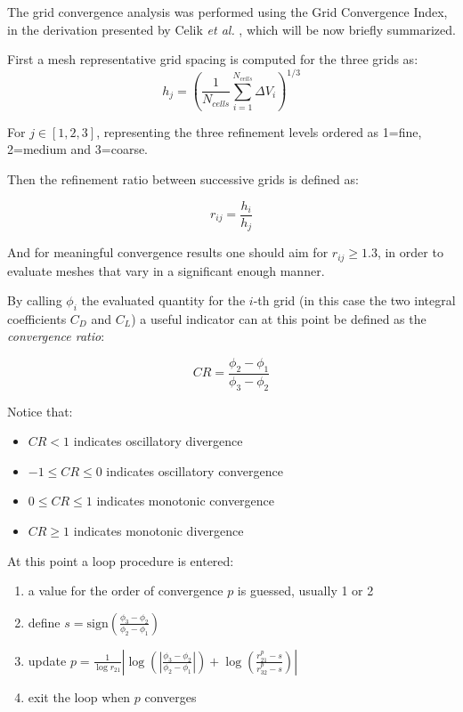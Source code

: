 \documentclass[12pt,a4paper]{article}
\begin{document}
The grid convergence analysis was performed using the Grid Convergence Index, in the derivation presented by Celik \textit{et al.} \cite{celik2008}, which will be now briefly summarized.

First a mesh representative grid spacing is computed for the three grids as:
\begin{equation}
    h_j = (\frac{1}{N_{cells}}\sum_{i=1}^{N_{cells}}\Delta V_i)^{1/3}
\end{equation}

For $j\in[1,2,3]$, representing the three refinement levels ordered as 1=fine, 2=medium and 3=coarse.

Then the refinement ratio between successive grids is defined as:

\begin{equation}
    r_{ij} = \frac{h_i}{h_j}
\end{equation}

And for meaningful convergence results one should aim for $r_{ij}\geq1.3$, in order to evaluate meshes that vary in a significant enough manner.

By calling $\phi_i$ the evaluated quantity for the $i$-th grid (in this case the two integral coefficients $C_D$ and $C_L$) a useful indicator can at this point be defined as the \textit{convergence ratio}:

\begin{equation}
    CR = \frac{\phi_2 - \phi_1}{\phi_3 - \phi_2}
\end{equation}

Notice that:

\begin{itemize}
    \item $CR<1$ indicates oscillatory divergence
    \item $-1\leq CR\leq0$ indicates oscillatory convergence
    \item $0\leq CR\leq1$ indicates monotonic convergence
    \item $CR\geq1$ indicates monotonic divergence
\end{itemize}

At this point a loop procedure is entered:

\begin{enumerate}
    \item a value for the order of convergence $p$ is guessed, usually 1 or 2
    \item define $s = \text{sign}(\frac{\phi_3 - \phi_2}{\phi_2 - \phi_1})$
    \item update $p = \frac{1}{\log{r_{21}}}|\log(|\frac{\phi_3 - \phi_2}{\phi_2 - \phi_1}|)+\log(\frac{r_{21}^p - s}{r_{32}^p-s})|$
    \item exit the loop when $p$ converges
\end{enumerate}
\end{document}
